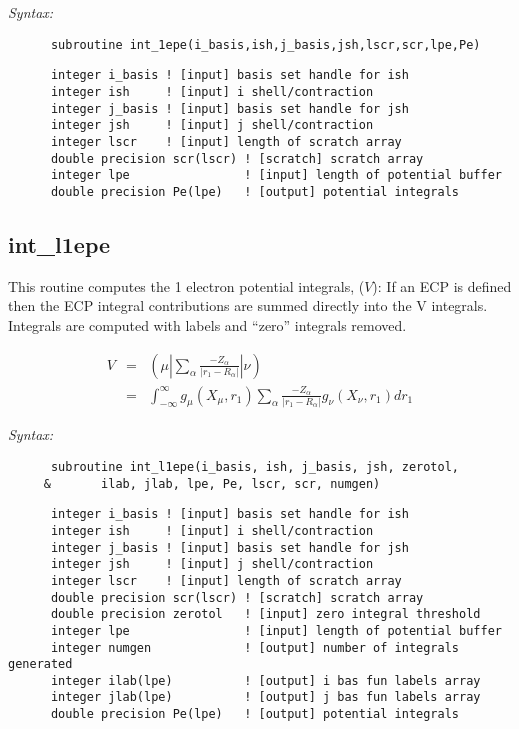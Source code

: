 {\it Syntax:} 
\begin{verbatim} 
      subroutine int_1epe(i_basis,ish,j_basis,jsh,lscr,scr,lpe,Pe) 
\end{verbatim} 
\begin{verbatim} 
      integer i_basis ! [input] basis set handle for ish 
      integer ish     ! [input] i shell/contraction 
      integer j_basis ! [input] basis set handle for jsh 
      integer jsh     ! [input] j shell/contraction 
      integer lscr    ! [input] length of scratch array 
      double precision scr(lscr) ! [scratch] scratch array 
      integer lpe                ! [input] length of potential buffer 
      double precision Pe(lpe)   ! [output] potential integrals 
\end{verbatim} 
\subsection{int\_l1epe} 
This routine computes the 1 electron potential integrals, ($V$): 
If an ECP is defined then the ECP integral contributions are summed  
directly into the V integrals.  Integrals are computed with labels  
and ``zero'' integrals removed.   
 
\begin{eqnarray*} 
V & = & ({\mu}|\sum_{\alpha}\frac{-Z_{\alpha}}{|r_{1}-R_{\alpha}|}|{\nu}) \\ 
  & = & \int_{-\infty}^{\infty} g_{\mu}(X_{\mu},r_{1})\sum_{\alpha}\frac 
{-Z_{\alpha}}{|r_{1}-R_{\alpha}|}g_{\nu}(X_{\nu},r_{1})dr_{1}  
\end{eqnarray*} 
 
{\it Syntax:} 
\begin{verbatim} 
      subroutine int_l1epe(i_basis, ish, j_basis, jsh, zerotol, 
     &       ilab, jlab, lpe, Pe, lscr, scr, numgen)  
\end{verbatim} 
\begin{verbatim} 
      integer i_basis ! [input] basis set handle for ish 
      integer ish     ! [input] i shell/contraction 
      integer j_basis ! [input] basis set handle for jsh 
      integer jsh     ! [input] j shell/contraction 
      integer lscr    ! [input] length of scratch array 
      double precision scr(lscr) ! [scratch] scratch array 
      double precision zerotol   ! [input] zero integral threshold 
      integer lpe                ! [input] length of potential buffer 
      integer numgen             ! [output] number of integrals generated 
      integer ilab(lpe)          ! [output] i bas fun labels array 
      integer jlab(lpe)          ! [output] j bas fun labels array 
      double precision Pe(lpe)   ! [output] potential integrals 
\end{verbatim} 
